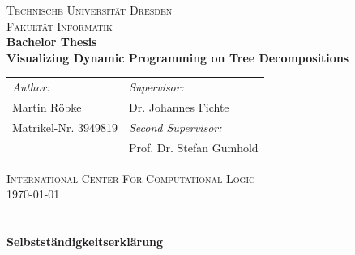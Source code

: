 \documentclass[a4paper, 12pt, bibliography=totoc]{scrartcl}
\begin{document}
\def\myauthor{Martin Röbke} 
\def\mycoauthor{Dr. Johannes Fichte} 
\def\mytitle{Visualizing Dynamic Programming on Tree Decompositions} 
\def\mydate{\today} 
\def\mymatriculation{3949819}
\def\mybirthday{04.03.1995}
\def\myemail{Martin.Roebke@tu-dresden.de}

\begin{titlepage}
	\begin{center}
		\textsc{\large 
		{Technische Universität Dresden \\
			Fakultät Informatik} \\
		[8ex]}             
		{\Large\bfseries Bachelor Thesis}           \\[12ex]
		
		{\huge\bfseries \mytitle}                  \\[6.5ex]
		
		\vspace{12ex}
			
		
		{\Large 
			\begin{tabular}{p{}l}
			
				\textit{Author:}&  \textit{Supervisor:}\\
				
				\myauthor &  Dr. Johannes Fichte\\
				
			{\normalsize Matrikel-Nr. 3949819}& \textit{Second Supervisor:}\\
				&  Prof. Dr. Stefan Gumhold\\[20ex]
				
			\end{tabular}
		}
		
		\vfill
		\textsc{International Center For Computational Logic 		\\[4ex]}
		\mydate
	\end{center}
\end{titlepage}
\newpage
\section*{ }
\thispagestyle{empty}
{\huge\bfseries{Selbstständigkeitserklärung}\vspace{20pt}}
\end{document}

